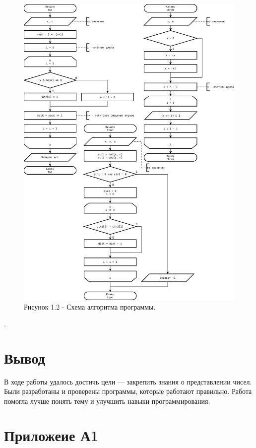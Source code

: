 \documentclass[oneside,a4paper,14pt]{extarticle}
\begin{document}
\begin{figure}[h!]
    \centering
    \includegraphics[height=0.9\textheight]{pics/flowchart_p2.png} 
	\caption*{Рисунок 1.2 - Схема алгоритма программы.}
\end{figure}.\\

\section*{Вывод}
В ходе работы удалось достичь цели --- закрепить знания о представлении чисел.
Были разработаны и проверены программы, которые работают правильно. Работа
помогла лучше понять тему и улучшить навыки программирования.

\section*{Приложеие А1}
\end{document}
